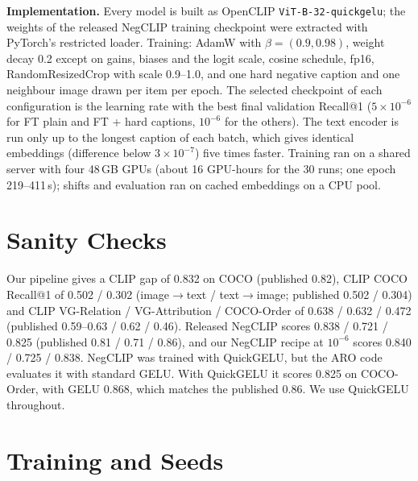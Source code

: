 \documentclass{article}
\begin{document}
\textbf{Implementation.} Every model is built as OpenCLIP \texttt{ViT-B-32-quickgelu}; the weights of the released NegCLIP training checkpoint were extracted with PyTorch's restricted loader. Training: AdamW with $\beta=(0.9, 0.98)$, weight decay 0.2 except on gains, biases and the logit scale, cosine schedule, fp16, RandomResizedCrop with scale 0.9--1.0, and one hard negative caption and one neighbour image drawn per item per epoch. The selected checkpoint of each configuration is the learning rate with the best final validation Recall@1 ($5{\times}10^{-6}$ for FT plain and FT + hard captions, $10^{-6}$ for the others). The text encoder is run only up to the longest caption of each batch, which gives identical embeddings (difference below $3{\times}10^{-7}$) five times faster. Training ran on a shared server with four 48\,GB GPUs (about 16 GPU-hours for the 30 runs; one epoch 219--411\,s); shifts and evaluation ran on cached embeddings on a CPU pool.

\section{Sanity Checks}
\label{app:sanity}

Our pipeline gives a CLIP gap of 0.832 on COCO (published 0.82), CLIP COCO Recall@1 of 0.502 / 0.302 (image$\to$text / text$\to$image; published 0.502 / 0.304) and CLIP VG-Relation / VG-Attribution / COCO-Order of 0.638 / 0.632 / 0.472 (published 0.59--0.63 / 0.62 / 0.46). Released NegCLIP scores 0.838 / 0.721 / 0.825 (published 0.81 / 0.71 / 0.86), and our NegCLIP recipe at $10^{-6}$ scores 0.840 / 0.725 / 0.838. NegCLIP was trained with QuickGELU, but the ARO code evaluates it with standard GELU. With QuickGELU it scores 0.825 on COCO-Order, with GELU 0.868, which matches the published 0.86. We use QuickGELU throughout.

\section{Training and Seeds}
\label{app:train}
\end{document}
